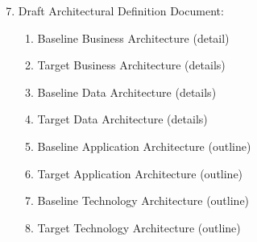 \documentclass[aspectratio=169, table]{beamer}
\begin{document}
\begin{frame}
\begin{columns}
            \begin{column}{0.5\textwidth}
                \begin{center}
                    \begin{enumerate}
                        \setcounter{enumi}{6}
                        \item Draft Architectural Definition Document:
                        \begin{enumerate}
                            \item Baseline Business Architecture (detail)
                            \item Target Business Architecture (details)
                            \item Baseline Data Architecture (details)
                            \item Target Data Architecture (details)
                            \item Baseline Application Architecture (outline)
                            \item Target Application Architecture (outline)
                            \item Baseline Technology Architecture (outline)
                            \item Target Technology Architecture (outline)
                        \end{enumerate}

                    \end{enumerate}
                \end{center}
            \end{column}
        \end{columns}
    \end{frame}
\end{document}
